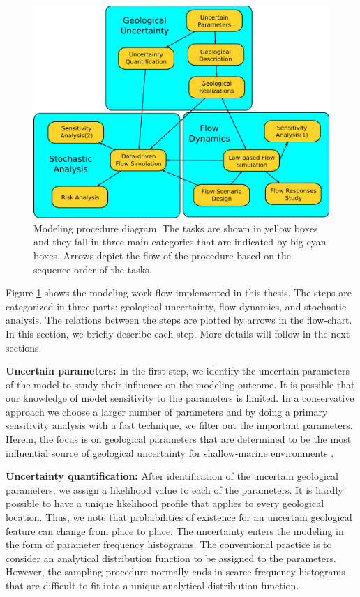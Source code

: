 \begin{figure}
  \center
  \includegraphics[width=0.95 \linewidth]{./figurer/prc3}
  \caption{Modeling procedure diagram. The tasks are shown in yellow boxes and they fall in three main categories that are indicated by big cyan boxes. Arrows depict the flow of the procedure based on the sequence order of the tasks.}
  \label{fig:prc}
%
\end{figure}

Figure \ref{fig:prc} shows the modeling work-flow implemented in this thesis. The steps are categorized in three parts: geological uncertainty,
flow dynamics, and stochastic analysis. The relations between the steps are plotted by arrows in the flow-chart. In this section, we briefly describe each step. More details will follow in the next sections.

\textbf{Uncertain parameters:} In the first step, we identify the uncertain
parameters of the model  to study their influence on the modeling outcome. It is possible that our knowledge of model sensitivity to the parameters is limited. In a conservative approach we choose a larger number of parameters and by doing a primary sensitivity analysis with a fast technique, we filter out the important parameters. Herein, the focus is on geological parameters that are determined to be the most influential source of geological uncertainty for shallow-marine environments \cite{howell2008sedimentological}.

\textbf{Uncertainty quantification:} After identification of the uncertain
geological parameters, we assign a likelihood value to each of the parameters. It is hardly possible to have a unique likelihood profile that applies to every
geological location. Thus, we note that probabilities of existence for an
uncertain geological feature can change from place to place. The uncertainty
enters the modeling in the form of parameter frequency histograms. The
conventional practice is to consider an analytical distribution function to be
assigned to the parameters. However, the sampling procedure normally ends in
scarce frequency histograms that are difficult to fit into a unique analytical
distribution function.

